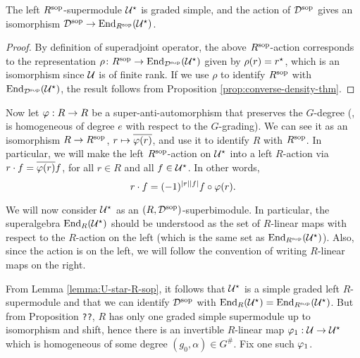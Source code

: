 \documentclass{amsbook}
\begin{document}
\begin{lemma}\label{lemma:U-star-R-sop}
    The left $R^{\mathrm{sop}}$-supermodule $\mathcal U^\star$ is graded simple, and the action of $\mathcal{D}^{\mathrm{sop}}$ gives an isomorphism $\mathcal{D}^{\mathrm{sop}} \to \operatorname{End}_{R^{\mathrm{sop}}}(\mathcal U^\star)$.
\end{lemma}

\begin{proof}
    By definition of superadjoint operator, the above $R^{\mathrm{sop}}$-action corresponds to the representation $\rho\colon R^{\mathrm{sop}} \to \operatorname{End}_{\mathcal{D}^{\mathrm{sop}}} (\mathcal U^\star)$ given by $ \rho(r) = r^\star$, which is an isomorphism since $\mathcal U$ is of finite rank. 
    If we use $\rho$ to identify $R^{\mathrm{sop}}$ with $\operatorname{End}_{\mathcal{D}^{\mathrm{sop}}} (\mathcal U^\star)$, the result follows from Proposition \ref{prop:converse-density-thm}.
\end{proof}


Now let $\varphi: R\to R$ be a super-anti-automorphism that preserves the $G$-degree (\ie, is homogeneous of degree $e$ with respect to the $G$-grading).
We can see it as an isomorphism $R\to R^{\mathrm{sop}}$, $r \mapsto \overline{ \varphi(r)}$, and use it to identify $R$ with $R^{\mathrm{sop}}$. 
In particular, we will make the left $R^{\mathrm{sop}}$-action on $\mathcal U^\star$ into a left $R$-action via $r\cdot f = \overline{\varphi(r)}f$, for all $r\in R$ and all $f\in \mathcal U^\star$. 
In other words,
%
\begin{equation}\label{eq:R-action-back-on-the-right}
    r\cdot f = (-1)^{|r||f|} f \circ \varphi(r) .
\end{equation}

We will now consider $\mathcal U^\star$ as an $(R,\mathcal{D}^{\mathrm{sop}})$-superbimodule. 
In particular, the superalgebra $\operatorname{End}_R(\mathcal U^\star)$ should be understood as the set of $R$-linear maps with respect to the $R$-action on the left (which is the same set as $\operatorname{End}_{R^{\mathrm{sop}}} (\mathcal U^\star)$). 
Also, since the action is on the left, we will follow the convention of writing $R$-linear maps on the right.

From Lemma \ref{lemma:U-star-R-sop}, it follows that $\mathcal U^\star$ is a simple graded left $R$-supermodule and that we can identify $\mathcal{D}^{\mathrm{sop}}$ with $\operatorname{End}_R (\mathcal U^\star) = \operatorname{End}_{R^{\mathrm{sop}}} (\mathcal U^\star)$. 
But from Proposition {\tt ??}, $R$ has only one graded simple supermodule up to isomorphism and shift, hence there is an invertible $R$-linear map $\varphi_1: \mathcal U \to \mathcal U^\star$ which is homogeneous of some degree $(g_0, \alpha)\in G^\#$. 
Fix one such $\varphi_1$.
\end{document}
